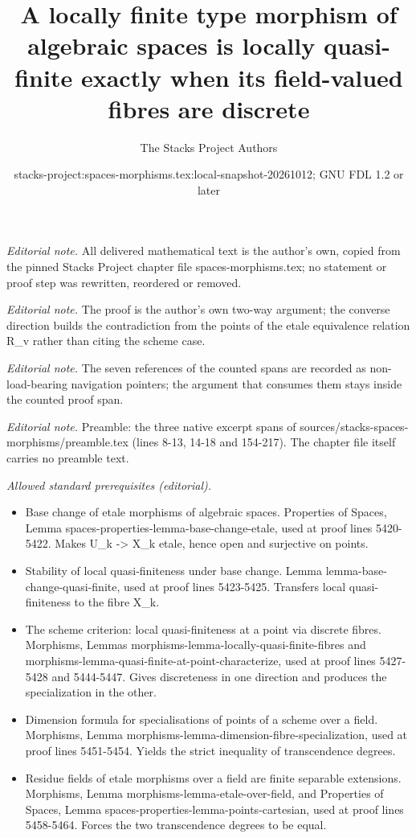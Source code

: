 \documentclass[10pt,a4paper]{amsart}
\title{A locally finite type morphism of algebraic spaces is locally quasi-finite exactly when its field-valued fibres are discrete}
\author{The Stacks Project Authors}
\date{stacks-project:spaces-morphisms.tex:local-snapshot-20261012; GNU FDL 1.2 or later}
\theoremstyle{plain}
\theoremstyle{definition}
\theoremstyle{remark}
\numberwithin{equation}{subsection}
\begin{document}
\maketitle
\setcounter{subsection}{1}
\noindent\textit{Editorial note.} All delivered mathematical text is the author's own, copied from the pinned Stacks Project chapter file spaces-morphisms.tex; no statement or proof step was rewritten, reordered or removed.\par\medskip
\noindent\textit{Editorial note.} The proof is the author's own two-way argument; the converse direction builds the contradiction from the points of the etale equivalence relation R\_v rather than citing the scheme case.\par\medskip
\noindent\textit{Editorial note.} The seven references of the counted spans are recorded as non-load-bearing navigation pointers; the argument that consumes them stays inside the counted proof span.\par\medskip
\noindent\textit{Editorial note.} Preamble: the three native excerpt spans of sources/stacks-spaces-morphisms/preamble.tex (lines 8-13, 14-18 and 154-217). The chapter file itself carries no preamble text.\par\medskip
\noindent\textit{Allowed standard prerequisites (editorial).}\begin{itemize}
\item Base change of etale morphisms of algebraic spaces. Properties of Spaces, Lemma spaces-properties-lemma-base-change-etale, used at proof lines 5420-5422. Makes U\_k -> X\_k etale, hence open and surjective on points.
\item Stability of local quasi-finiteness under base change. Lemma lemma-base-change-quasi-finite, used at proof lines 5423-5425. Transfers local quasi-finiteness to the fibre X\_k.
\item The scheme criterion: local quasi-finiteness at a point via discrete fibres. Morphisms, Lemmas morphisms-lemma-locally-quasi-finite-fibres and morphisms-lemma-quasi-finite-at-point-characterize, used at proof lines 5427-5428 and 5444-5447. Gives discreteness in one direction and produces the specialization in the other.
\item Dimension formula for specialisations of points of a scheme over a field. Morphisms, Lemma morphisms-lemma-dimension-fibre-specialization, used at proof lines 5451-5454. Yields the strict inequality of transcendence degrees.
\item Residue fields of etale morphisms over a field are finite separable extensions. Morphisms, Lemma morphisms-lemma-etale-over-field, and Properties of Spaces, Lemma spaces-properties-lemma-points-cartesian, used at proof lines 5458-5464. Forces the two transcendence degrees to be equal.
\end{itemize}\medskip
\end{document}
